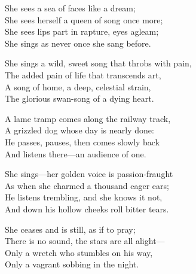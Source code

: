 \begin{poemblock}
She sees a sea of faces like a dream;\\
\idt She sees herself a queen of song once more;\\
She sees lips part in rapture, eyes agleam;\\
\idt She sings as never once she sang before.

She sings a wild, sweet song that throbs with pain,\\
\idt The added pain of life that transcends art,\\
A song of home, a deep, celestial strain,\\
\idt The glorious swan-song of a dying heart.

A lame tramp comes along the railway track,\\
\idt A grizzled dog whose day is nearly done:\\
He passes, pauses, then comes slowly back\\
\idt And listens there—an audience of one.

She sings—her golden voice is passion-fraught\\
\idt As when she charmed a thousand eager ears;\\
He listens trembling, and she knows it not,\\
\idt And down his hollow cheeks roll bitter tears.

She ceases and is still, as if to pray;\\
\idt There is no sound, the stars are all alight—\\
Only a wretch who stumbles on his way,\\
\idt Only a vagrant sobbing in the night.

\end{poemblock}
